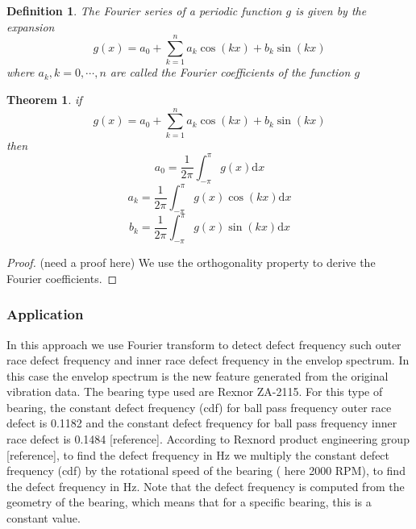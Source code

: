 \documentclass[11pt, oneside]{article}   	%
\newtheorem{theorem}{Theorem}
\newtheorem{definition}{Definition}
\newtheorem{proof}{Proof}
\begin{document}
\begin{definition}
The Fourier series of a periodic function $g$ is given by the expansion 
\begin{equation}
g(x) = a_{0} + \sum_{k=1}^{n}a_{k}\cos(kx)+b_{k}\sin(kx)
\end{equation}
where $a_{k}, k=0,\cdots, n$ are called the Fourier coefficients of the function $g$
\end{definition}

\begin{theorem}
if 
\begin{equation}
g(x) = a_{0} + \sum_{k=1}^{n}a_{k}\cos(kx)+b_{k}\sin(kx)
\end{equation}
then 
\begin{equation}
a_{0} = \frac{1}{2\pi}\int_{-\pi}^{\pi}g(x)\mathrm{d}x
\end{equation}
\begin{equation}
a_{k} = \frac{1}{2\pi}\int_{-\pi}^{\pi}g(x)\cos(kx)\mathrm{d}x
\end{equation}
\begin{equation}
b_{k} = \frac{1}{2\pi}\int_{-\pi}^{\pi}g(x)\sin(kx)\mathrm{d}x
\end{equation}
\end{theorem}

\begin{proof}
(need a proof here) We use the orthogonality property to derive the Fourier coefficients.
\end{proof}












\subsubsection{Application}
In this approach we use Fourier transform to detect defect frequency such outer race defect frequency and inner race defect frequency in the envelop spectrum. In this case the envelop spectrum is the new feature generated from the original vibration data. The bearing type used are Rexnor ZA-2115. For this type of bearing, the constant defect frequency (cdf) for ball pass frequency outer race defect is 0.1182 and the constant defect frequency for ball pass frequency inner race defect is 0.1484 [reference]. According to Rexnord product engineering group [reference], to find the defect frequency in Hz we multiply the constant defect frequency (cdf) by the rotational speed of the bearing ( here 2000 RPM), to find the defect frequency in Hz. Note that the defect frequency is computed from the geometry of the bearing, which means that for a specific bearing, this is a constant value. 
\end{document}

